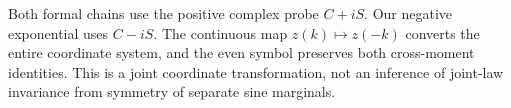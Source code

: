Both formal chains use the positive complex probe $C+iS$. Our negative
exponential uses $C-iS$. The continuous map $z(k)\mapsto z(-k)$ converts the
entire coordinate system, and the even symbol preserves both cross-moment
identities. This is a joint coordinate transformation, not an inference of
joint-law invariance from symmetry of separate sine marginals.
